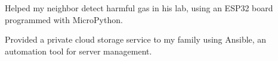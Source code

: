 
\vspace{-.4cm}
\begin{cventries}
  \cventry
  {} %
  {} %
  {} %
  {} %
    {
      \begin{cvitems} %
      \item{Helped my neighbor detect harmful gas in his lab, using an ESP32 board programmed with MicroPython.}
      \item{Provided a private cloud storage service to my family using Ansible, an automation tool for server management.}
      \end{cvitems}
    }
\end{cventries}
